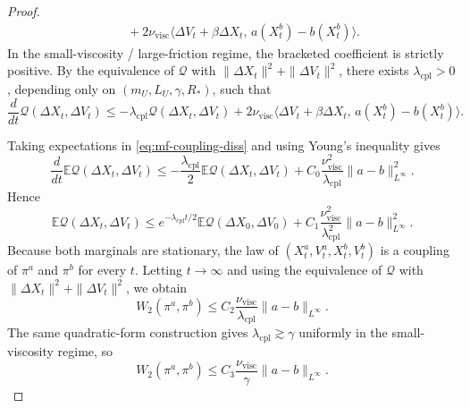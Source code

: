 \documentclass[11pt]{article}
\theoremstyle{definition}
\theoremstyle{remark}
\newcommand{\E}{\mathbb{E}}
\begin{document}
\begin{proof}
\begin{align*}
&\quad
+2\nu_{\mathrm{visc}}
\bigl\langle \Delta V_t+\beta\Delta X_t,\,
a(X_t^b)-b(X_t^b)\bigr\rangle.
\end{align*}
In the small-viscosity / large-friction regime, the bracketed coefficient is
strictly positive. By the equivalence of \(\mathscr Q\) with
\(\|\Delta X_t\|^2+\|\Delta V_t\|^2\), there exists
\(\lambda_{\mathrm{cpl}}>0\), depending only on
\((m_U,L_U,\gamma,R_*)\), such that
\begin{equation}\label{eq:mf-coupling-diss}
\frac{d}{dt}\mathscr Q(\Delta X_t,\Delta V_t)
\le
-\lambda_{\mathrm{cpl}}\mathscr Q(\Delta X_t,\Delta V_t)
+2\nu_{\mathrm{visc}}
\bigl\langle
\Delta V_t+\beta\Delta X_t,\,
a(X_t^b)-b(X_t^b)
\bigr\rangle.
\end{equation}

Taking expectations in \eqref{eq:mf-coupling-diss} and using Young's inequality
gives
\[
\frac{d}{dt}\E \mathscr Q(\Delta X_t,\Delta V_t)
\le
-\frac{\lambda_{\mathrm{cpl}}}{2}\E \mathscr Q(\Delta X_t,\Delta V_t)
+C_0\frac{\nu_{\mathrm{visc}}^2}{\lambda_{\mathrm{cpl}}}\|a-b\|_{L^\infty}^2.
\]
Hence
\[
\E \mathscr Q(\Delta X_t,\Delta V_t)
\le
e^{-\lambda_{\mathrm{cpl}}t/2}\E \mathscr Q(\Delta X_0,\Delta V_0)
+C_1\frac{\nu_{\mathrm{visc}}^2}{\lambda_{\mathrm{cpl}}^2}\|a-b\|_{L^\infty}^2.
\]
Because both marginals are stationary, the law of
\((X_t^a,V_t^a,X_t^b,V_t^b)\) is a coupling of \(\pi^a\) and \(\pi^b\) for
every \(t\). Letting \(t\to\infty\) and using the equivalence of
\(\mathscr Q\) with \(\|\Delta X_t\|^2+\|\Delta V_t\|^2\), we obtain
\begin{equation}\label{eq:mf-w2-stability}
W_2(\pi^a,\pi^b)
\le
C_2\frac{\nu_{\mathrm{visc}}}{\lambda_{\mathrm{cpl}}}\|a-b\|_{L^\infty}.
\end{equation}
The same quadratic-form construction gives
\(\lambda_{\mathrm{cpl}}\gtrsim \gamma\) uniformly in the small-viscosity
regime, so
\[
W_2(\pi^a,\pi^b)
\le
C_3\frac{\nu_{\mathrm{visc}}}{\gamma}\|a-b\|_{L^\infty}.
\]


\end{proof}
\end{document}
